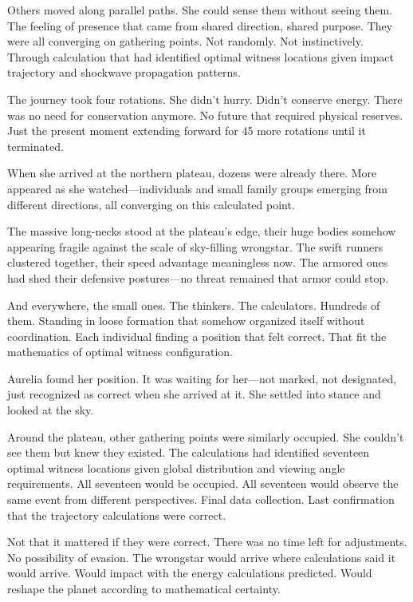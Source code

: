 Others moved along parallel paths. She could sense them without seeing them. The feeling of presence that came from shared direction, shared purpose. They were all converging on gathering points. Not randomly. Not instinctively. Through calculation that had identified optimal witness locations given impact trajectory and shockwave propagation patterns.

The journey took four rotations. She didn't hurry. Didn't conserve energy. There was no need for conservation anymore. No future that required physical reserves. Just the present moment extending forward for 45 more rotations until it terminated.

When she arrived at the northern plateau, dozens were already there. More appeared as she watched—individuals and small family groups emerging from different directions, all converging on this calculated point.

The massive long-necks stood at the plateau's edge, their huge bodies somehow appearing fragile against the scale of sky-filling wrongstar. The swift runners clustered together, their speed advantage meaningless now. The armored ones had shed their defensive postures—no threat remained that armor could stop.

And everywhere, the small ones. The thinkers. The calculators. Hundreds of them. Standing in loose formation that somehow organized itself without coordination. Each individual finding a position that felt correct. That fit the mathematics of optimal witness configuration.

Aurelia found her position. It was waiting for her—not marked, not designated, just recognized as correct when she arrived at it. She settled into stance and looked at the sky.

Around the plateau, other gathering points were similarly occupied. She couldn't see them but knew they existed. The calculations had identified seventeen optimal witness locations given global distribution and viewing angle requirements. All seventeen would be occupied. All seventeen would observe the same event from different perspectives. Final data collection. Last confirmation that the trajectory calculations were correct.

Not that it mattered if they were correct. There was no time left for adjustments. No possibility of evasion. The wrongstar would arrive where calculations said it would arrive. Would impact with the energy calculations predicted. Would reshape the planet according to mathematical certainty.

